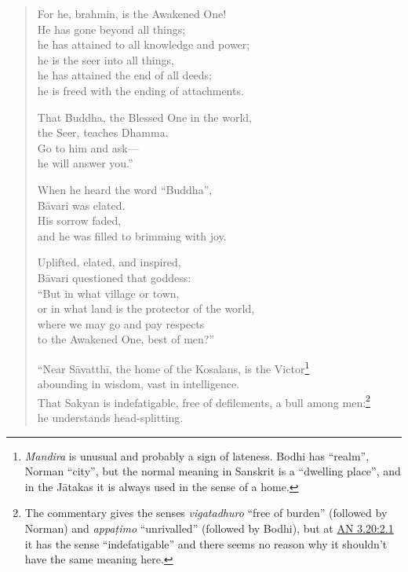 \documentclass[12pt,openany]{book}%
\begin{document}
\begin{verse}
For he, brahmin, is the Awakened One! \\
He has gone beyond all things; \\
he has attained to all knowledge and power; \\
he is the seer into all things, \\
he has attained the end of all deeds; \\
he is freed with the ending of attachments. 

That Buddha, the Blessed One in the world, \\
the Seer, teaches Dhamma. \\
Go to him and ask—\\
he will answer you.” 

When he heard the word “Buddha”, \\
\textsanskrit{Bāvari} was elated. \\
His sorrow faded, \\
and he was filled to brimming with joy. 

Uplifted, elated, and inspired, \\
\textsanskrit{Bāvari} questioned that goddess: \\
“But in what village or town, \\
or in what land is the protector of the world, \\
where we may go and pay respects \\
to the Awakened One, best of men?” 

“Near \textsanskrit{Sāvatthī}, the home of the Kosalans, is the Victor\footnote{\textit{Mandira} is unusual and probably a sign of lateness. Bodhi has “realm”, Norman “city”, but the normal meaning in Sanskrit is a “dwelling place”, and in the \textsanskrit{Jātakas} it is always used in the sense of a home. } \\
abounding in wisdom, vast in intelligence. \\
That Sakyan is indefatigable, free of defilements, a bull among men:\footnote{The commentary gives the senses \textit{vigatadhuro} “free of burden” (followed by Norman) and \textit{\textsanskrit{appaṭimo}} “unrivalled” (followed by Bodhi), but at \href{https://suttacentral.net/an3.20/en/sujato\#2.1}{AN 3.20:2.1} it has the sense “indefatigable” and there seems no reason why it shouldn’t have the same meaning here. } \\
he understands head-splitting. 


\end{verse}
\end{document}
